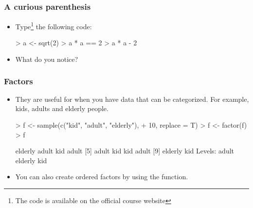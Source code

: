 \begin{frame}
  \frametitle{A curious parenthesis}
  \begin{itemize}
  \item Type\footnote{The  code is available on the official course website} the following code:
\begin{Schunk}
\begin{Sinput}
> a <- sqrt(2)
> a * a == 2
> a * a - 2
\end{Sinput}
\end{Schunk}
  \item What do you notice?
  \end{itemize}
\end{frame}

\begin{frame}
  \frametitle{Factors}
  \begin{itemize}
  \item They are useful for when you have data that can be categorized. For example, kids, adults and elderly people.
\begin{Schunk}
\begin{Sinput}
> f <- sample(c("kid", "adult", "elderly"), 
+     10, replace = T)
> f <- factor(f)
> f
\end{Sinput}
\begin{Soutput}
 [1] elderly adult   kid     adult  
 [5] adult   kid     kid     adult  
 [9] elderly kid    
Levels: adult elderly kid
\end{Soutput}
\end{Schunk}
  \item You can also create ordered factors by using the  function.
  \end{itemize}
\end{frame}

